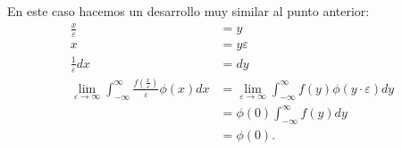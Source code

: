 \documentclass{report}   
\begin{document}
\chapter{}

En este caso hacemos un desarrollo muy similar al punto anterior:
\begin{align*}
  \frac{x}{\varepsilon} &= y\\
  x &= y\varepsilon \\
  \frac{1}{\varepsilon} dx &= dy \\
  \lim_{\varepsilon \to \infty} \int_{-\infty}^{\infty} \frac{f\left( \frac{x}{\varepsilon} \right) }{\varepsilon} \phi\left( x \right) dx &= \lim_{\varepsilon \to \infty} \int_{-\infty}^{\infty}f\left( y \right) \phi\left( y\cdot \varepsilon \right) dy  \\
  &= \phi\left( 0 \right) \int_{-\infty}^{\infty} f\left( y \right) dy \\
  &= \phi\left( 0 \right) 
.\end{align*}

\chapter{}
\end{document}
